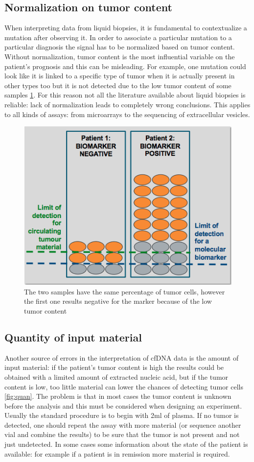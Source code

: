 \subsection{Normalization on tumor content}
When interpreting data from liquid biopsies, it is fundamental to contextualize a mutation after observing it. In order to associate a particular mutation to a particular diagnosis the signal has to be normalized based on tumor content. Without normalization, tumor content is the most influential variable on the patient's prognosis and this can be misleading. For example, one mutation could look like it is linked to a specific type of tumor when it is actually present in other types too but it is not detected due to the low tumor content of some samples \ref{fig:norm}. For this reason not all the literature available about liquid biopsies is reliable: lack of normalization leads to completely wrong conclusions. This applies to all kinds of assays: from microarrays to the sequencing of extracellular vesicles. \\

\begin{figure}[!ht]
\centering
    \includegraphics[width=0.4\linewidth]{norm.png}
    \caption{\label{fig:norm}The two samples have the same percentage of tumor cells, however the first one results negative for the marker because of the low tumor content}
\end{figure}

\subsection{Quantity of input material}
Another source of errors in the interpretation of cfDNA data is the amount of input material: if the patient's tumor content is high the results could be obtained with a limited amount of extracted nucleic acid, but if the tumor content is low, too little material can lower the chances of detecting tumor cells \ref{fig:quan}. The problem is that in most cases the tumor content is unknown before the analysis and this must be considered when designing an experiment. Usually the standard procedure is to begin with 2ml of plasma. If no tumor is detected, one should repeat the assay with more material (or sequence another vial and combine the results) to be sure that the tumor is not present and not just undetected. In some cases some information about the state of the patient is available: for example if a patient is in remission more material is required.

